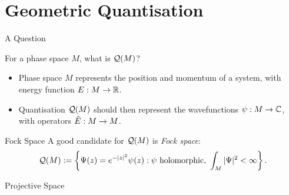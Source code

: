 \section{Geometric Quantisation}

\begin{frame}{A Question}

    For a phase space $M$, what is $\mathcal{Q}(M)$?

    \begin{itemize}
        \item Phase space $M$ represents the position and momentum of a system, with energy function $E : M \rightarrow \mathbb{R}$.
        \item Quantisation $\mathcal{Q}(M)$ should then represent the wavefunctions $\psi : M \rightarrow \mathbb{C}$, with operators $\hat{E} : M \rightarrow M$.
    \end{itemize}

    \begin{block}{Fock Space}
        A good candidate for $\mathcal{Q}(M)$ is \emph{Fock space}:
        \begin{equation*}
            \mathcal{Q}(M) := \left\{ \Psi(z) = e^{-|z|^{2}}\psi(z) : \psi \text{ holomorphic},\ \int_{M} |\Psi|^{2} < \infty \right\}.
        \end{equation*}
    \end{block}

\end{frame}

\begin{frame}{Projective Space}

    

\end{frame}